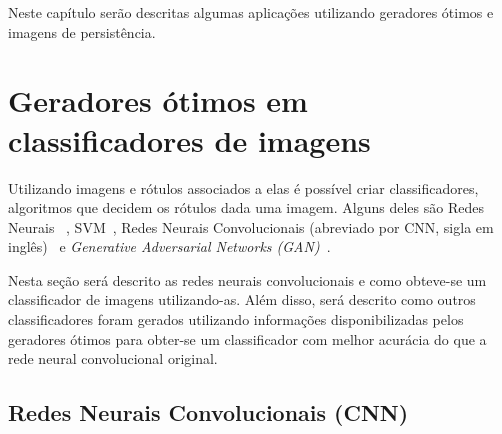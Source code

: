 Neste capítulo serão descritas algumas aplicações utilizando geradores ótimos e
imagens de persistência.

\section{Geradores ótimos em classificadores de imagens}

Utilizando imagens e rótulos associados a elas é possível criar classificadores,
algoritmos que decidem os rótulos dada uma imagem. Alguns deles são Redes Neurais
~\cite{McCulloch1943}, SVM~\cite{Cortes1995}, Redes Neurais Convolucionais
(abreviado por CNN, sigla em inglês)~\cite{LeCun1989} e \textit{Generative Adversarial
Networks (GAN)}~\cite{Goodfellow2014}.

Nesta seção será descrito as redes neurais convolucionais e como obteve-se um
classificador de imagens utilizando-as. Além disso, será descrito como outros
classificadores foram gerados utilizando informações disponibilizadas
pelos geradores ótimos para obter-se um classificador com melhor acurácia
do que a rede neural convolucional original.

\subsection{Redes Neurais Convolucionais (CNN)}

